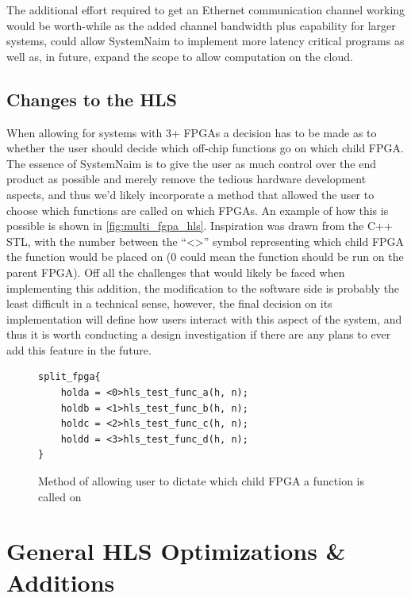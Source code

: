 The additional effort required to get an Ethernet communication channel working would be worth-while as the added channel bandwidth plus capability for larger systems, could allow SystemNaim to implement more latency critical programs as well as, in future, expand the scope to allow computation on the cloud.

\subsection{Changes to the HLS}

When allowing for systems with 3+ FPGAs a decision has to be made as to whether the user should decide which off-chip functions go on which child FPGA. The essence of SystemNaim is to give the user as much control over the end product as possible and merely remove the tedious hardware development aspects, and thus we'd likely incorporate a method that allowed the user to choose which functions are called on which FPGAs. An example of how this is possible is shown in \autoref{fig:multi_fgpa_hls}. Inspiration was drawn from the C++ STL, with the number between the “<>” symbol representing which child FPGA the function would be placed on (0 could mean the function should be run on the parent FPGA). Off all the challenges that would likely be faced when implementing this addition, the modification to the software side is probably the least difficult in a technical sense, however, the final decision on its implementation will define how users interact with this aspect of the system, and thus it is worth conducting a design investigation if there are any plans to ever add this feature in the future.

\begin{figure}[!htb]
    \centering
    \begin{minipage}{0.5\textwidth}
    \begin{verbatim}
split_fpga{
    holda = <0>hls_test_func_a(h, n);
    holdb = <1>hls_test_func_b(h, n);
    holdc = <2>hls_test_func_c(h, n);
    holdd = <3>hls_test_func_d(h, n);
}
    \end{verbatim}     
    \end{minipage}
    \caption{Method of allowing user to dictate which child FPGA a function is called on}
    \label{fig:multi_fgpa_hls}
\end{figure}

\section{General HLS Optimizations \& Additions}


